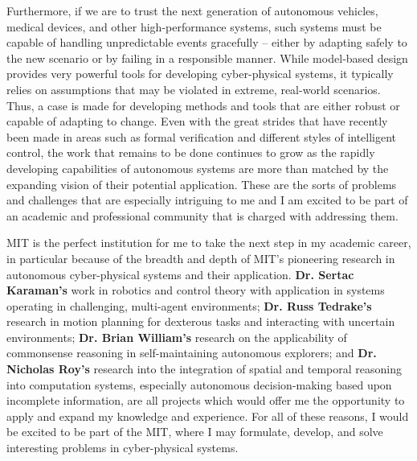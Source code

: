 \documentclass[11pt]{letter}
\begin{document}
Furthermore, if we are to trust the next generation of autonomous vehicles, medical devices, and other high-performance systems, such systems must be capable of handling unpredictable events gracefully -- either by adapting safely to the new scenario or by failing in a responsible manner. While model‑based design provides very powerful tools for developing cyber-physical systems, it typically relies on assumptions that may be violated in extreme, real-world scenarios. Thus, a case is made for developing methods and tools that are either robust or capable of adapting to change. Even with the great strides that have recently been made in areas such as formal verification and different styles of intelligent control, the work that remains to be done continues to grow as the rapidly developing capabilities of autonomous systems are more than matched by the expanding vision of their potential application.  These are the sorts of problems and challenges that are especially intriguing to me and I am excited to be part of an academic and professional community that is charged with addressing them.

MIT is the perfect institution for me to take the next step in my academic career, in particular because of the breadth and depth of MIT’s pioneering research in autonomous cyber-physical systems and their application.  \textbf{Dr. Sertac Karaman's} work in robotics and control theory with application in systems operating in challenging, multi-agent environments; \textbf{Dr. Russ Tedrake's} research in motion planning for dexterous tasks and interacting with uncertain environments; \textbf{Dr. Brian William's} research on the applicability of commonsense reasoning in self-maintaining autonomous explorers; and \textbf{Dr. Nicholas Roy's} research into the integration of spatial and temporal reasoning into computation systems, especially autonomous decision-making based upon incomplete information, are all projects which would offer me the opportunity to apply and expand my knowledge and experience.  For all of these reasons, I would be excited to be part of the MIT, where I may formulate, develop, and solve interesting problems in cyber-physical systems.

\begin{comment}
{\bf \emph{References}}

[1] "Cyber-Physical Systems." Baheti and Gill

[2] "Optimization and Control of Cyber-Physical Vehicle Systems." Bradley and Atkins

\end{comment}
\end{document}
